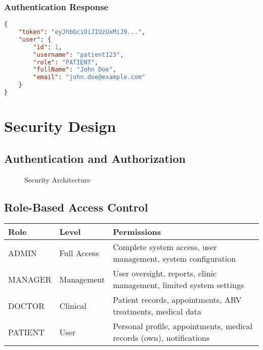 \documentclass[12pt,a4paper]{article}
\begin{document}
\subsubsection{Authentication Response}
\begin{lstlisting}[language=JSON, caption=Login Response]
{
    "token": "eyJhbGciOiJIUzUxMiJ9...",
    "user": {
        "id": 1,
        "username": "patient123",
        "role": "PATIENT",
        "fullName": "John Doe",
        "email": "john.doe@example.com"
    }
}
\end{lstlisting}

\section{Security Design}

\subsection{Authentication and Authorization}

\begin{figure}[H]
\centering
{}
\caption{Security Architecture}
\label{fig:security-architecture}
\end{figure}

\subsection{Role-Based Access Control}

\begin{longtable}{|p{2cm}|p{3cm}|p{9cm}|}
\hline
\textbf{Role} & \textbf{Level} & \textbf{Permissions} \\
\hline
ADMIN & Full Access & Complete system access, user management, system configuration \\
\hline
MANAGER & Management & User oversight, reports, clinic management, limited system settings \\
\hline
DOCTOR & Clinical & Patient records, appointments, ARV treatments, medical data \\
\hline
PATIENT & User & Personal profile, appointments, medical records (own), notifications \\
\hline
\end{longtable}
\end{document}
